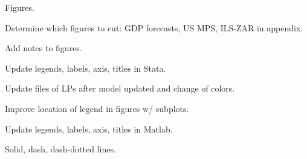 \documentclass[12pt]{article}
\newcommand{\cmark}{\ding{51}}
\newcommand{\done}{\rlap{$\square$}{\raisebox{2pt}{\large\hspace{1pt}\cmark}}%
	\hspace{-2.5pt}}
\begin{document}
\begin{todolist}
	\item[\done] Figures.
	\begin{todolist}
		\item[\done] Determine which figures to cut: GDP forecasts, US MPS, ILS-ZAR in appendix.
		\item[\done] Add notes to figures.
		\item[\done] Update legends, labels, axis, titles in Stata.
		\item[\done] Update files of LPs after model updated and change of colors.
		\item[\done] Improve location of legend in figures w/ subplots.
		\item[\done] Update legends, labels, axis, titles in Matlab.
		\item[\done] Solid, dash, dash-dotted lines.
	\end{todolist}
	

\end{todolist}
\end{document}
